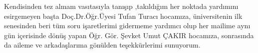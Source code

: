 Kendisinden tez almam vasıtasıyla tanışıp ,takıldığım her noktada yardımını esirgemeyen  başta Doç.Dr.Öğr.Üyesi Tufan Turacı hocamıza, üniversitenin ilk senesinden beri tüm soru işaretlerimi gidermeme yardımcı olup her mailime aynı gün içerisinde dönüş yapan Öğr. Gör. Şevket Umut ÇAKIR hocamıza, sonrasında da aileme ve arkadaşlarıma gönülden teşekkürlerimi sunuyorum.\\

